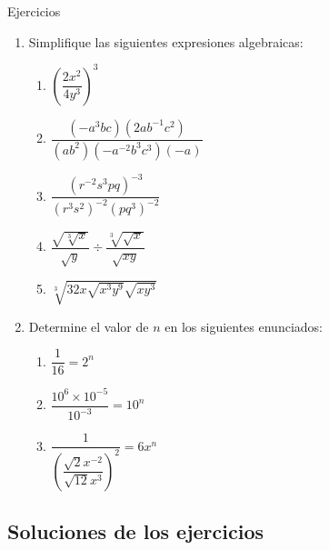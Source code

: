 \documentclass[10pt,handout,aspectratio=169]{beamer}
\newenvironment{stepenumerate}{\begin{enumerate}[<+->]}{\end{enumerate}}
\begin{document}
	\begin{frame}{Ejercicios}
		\begin{stepenumerate}
			\item Simplifique las siguientes expresiones algebraicas:
			
			\begin{stepenumerate}
				\item $\left(\dfrac{2x^{2}}{4y^{3}}\right)^{3}$
				
				\item $\dfrac{\left(-a^{3}bc\right)\left(2ab^{-1}c^{2}\right)}{(ab^{2})\left(-a^{-2}b^{3}c^{3}\right)(-a)}$
				
				\item $\dfrac{\left(r^{-2}s^{3}pq\right)^{-3}}{\left(r^{3}s^{2}\right)^{-2}\left(pq^{3}\right)^{-2}}$
				
				\item $\dfrac{\sqrt{\sqrt[3]{x}}}{\sqrt{y}}\div\dfrac{\sqrt[3]{\sqrt{x}}}{\sqrt{xy}}$
				
				\item $\sqrt[3]{32x\sqrt{x^{3}y^{9}}\sqrt{xy^{3}}}$
			\end{stepenumerate}
			
			\item Determine el valor de $n$ en los siguientes enunciados:
			
			\begin{stepenumerate}
				\item $\dfrac{1}{16}=2^{n}$
				
				\item $\dfrac{10^{6}\times 10^{-5}}{10^{-3}}=10^{n}$
				
				\item $\dfrac{1}{\left(\dfrac{\sqrt{2}x^{-2}}{\sqrt{12}x^{3}}\right)^{2}}=6x^{n}$
			\end{stepenumerate}
		\end{stepenumerate}
	\end{frame}
	
	\subsection{Soluciones de los ejercicios}
	
\end{document}
